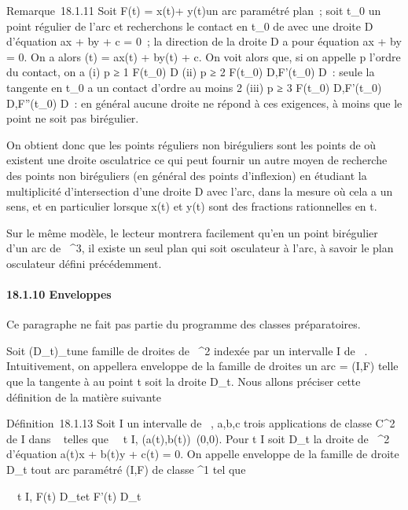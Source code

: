 \documentclass[]{article}
\begin{document}
Remarque~18.1.11 Soit F(t) = x(t)\vec\imath +
y(t) un arc paramétré plan~; soit t_0
un point régulier de l'arc et recherchons le contact en t_0 de
\Gamma avec une droite D d'équation ax + by + c = 0~; la direction
\vecD de la droite D a pour équation ax + by = 0. On
a alors \phi(t) = ax(t) + by(t) + c. On voit alors que, si on appelle p
l'ordre du contact, on a (i) p ≥ 1 \Leftrightarrow
F(t_0) \in D (ii) p ≥ 2 \Leftrightarrow
F(t_0) \in D,F'(t_0) \in\vec D~: seule
la tangente en t_0 a un contact d'ordre au moins 2 (iii) p ≥ 3
\Leftrightarrow F(t_0) \in D,F'(t_0)
\in\vec D,F''(t_0) \in\vec
D~: en général aucune droite ne répond à ces exigences, à moins que le
point ne soit pas birégulier.

On obtient donc que les points réguliers non biréguliers sont les points
de \Gamma où existent une droite osculatrice ce qui peut fournir un autre
moyen de recherche des points non biréguliers (en général des points
d'inflexion) en étudiant la multiplicité d'intersection d'une droite D
avec l'arc, dans la mesure où cela a un sens, et en particulier lorsque
x(t) et y(t) sont des fractions rationnelles en t.

Sur le même modèle, le lecteur montrera facilement qu'en un point
birégulier d'un arc de ~^3, il existe un seul plan qui soit
osculateur à l'arc, à savoir le plan osculateur défini précédemment.

\paragraph{18.1.10 Enveloppes}

Ce paragraphe ne fait pas partie du programme des classes préparatoires.

Soit (D_t)_t\inI une famille de droites de
~^2 indexée par un intervalle I de ~. Intuitivement, on
appellera enveloppe de la famille de droites un arc \Gamma = (I,F) telle que
la tangente à \Gamma au point t soit la droite D_t. Nous allons
préciser cette définition de la matière suivante

Définition~18.1.13 Soit I un intervalle de ~, a,b,c trois applications
de classe C^2 de I dans ~ telles que
\forall~~t \in I,
(a(t),b(t))\neq~(0,0). Pour t \in I soit
D_t la droite de ~^2 d'équation a(t)x + b(t)y + c(t)
= 0. On appelle enveloppe de la famille de droite D_t tout arc
paramétré (I,F) de classe ^1 tel que

\forall~~t \in I, F(t) \in
D_t\text et F'(t)
\in\overrightarrow D_t
\end{document}
